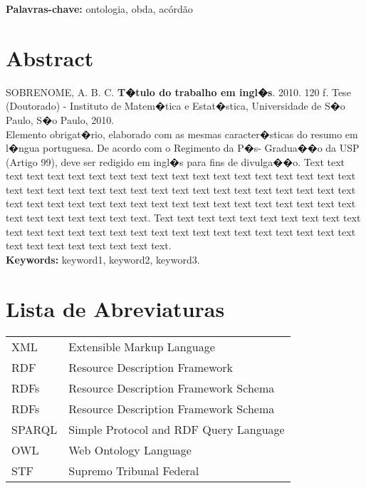 \documentclass[11pt,twoside,a4paper]{book}
\begin{document}
\noindent \textbf{Palavras-chave:} ontologia, obda, acórdão

\chapter*{Abstract}
\noindent SOBRENOME, A. B. C. \textbf{T�tulo do trabalho em ingl�s}. 
2010. 120 f.
Tese (Doutorado) - Instituto de Matem�tica e Estat�stica,
Universidade de S�o Paulo, S�o Paulo, 2010.
\\


Elemento obrigat�rio, elaborado com as mesmas caracter�sticas do resumo em
l�ngua portuguesa. De acordo com o Regimento da P�s- Gradua��o da USP (Artigo
99), deve ser redigido em ingl�s para fins de divulga��o. 
Text text text text text text text text text text text text text text text text
text text text text text text text text text text text text text text text text
text text text text text text text text text text text text text text text text
text text text text text text text text text text text text.
Text text text text text text text text text text text text text text text text
text text text text text text text text text text text text text text text text
text text text.
\\

\noindent \textbf{Keywords:} keyword1, keyword2, keyword3.

\tableofcontents    %

\chapter{Lista de Abreviaturas}
\begin{tabular}{ll}
    XML & Extensible Markup Language \\
    RDF & Resource Description Framework \\
    RDFs & Resource Description Framework Schema \\
    RDFs & Resource Description Framework Schema \\
    SPARQL & Simple Protocol and RDF Query Language \\
    OWL & Web Ontology Language \\
    STF & Supremo Tribunal Federal \\
\end{tabular}
\end{document}
